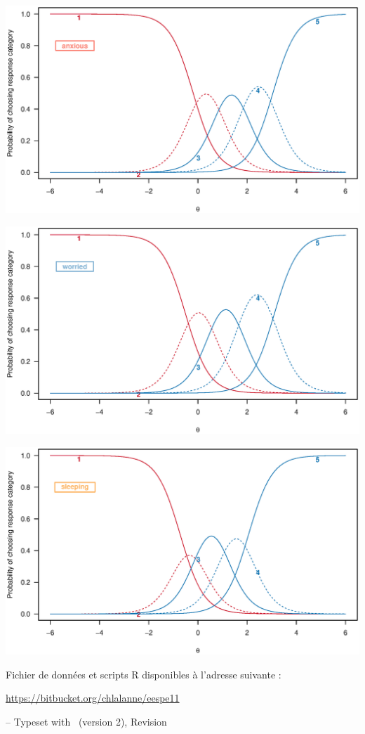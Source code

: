 \foilhead{}

{\centering \includegraphics[width=.8\textwidth]{figs/anxiety_grmcons_it4.eps}\par}

\foilhead{}

{\centering \includegraphics[width=.8\textwidth]{figs/anxiety_grmcons_it5.eps}\par}

\foilhead{}

{\centering \includegraphics[width=.8\textwidth]{figs/anxiety_grmcons_it6.eps}\par}


\foilhead{}

Fichier de données et scripts R disponibles à l'adresse suivante :\newline
{\centering \url{https://bitbucket.org/chlalanne/eespe11}\par}
\vfill

\raggedleft \scriptsize -- Typeset with \FoilTeX\ (version 2), Revision \VCRevision


